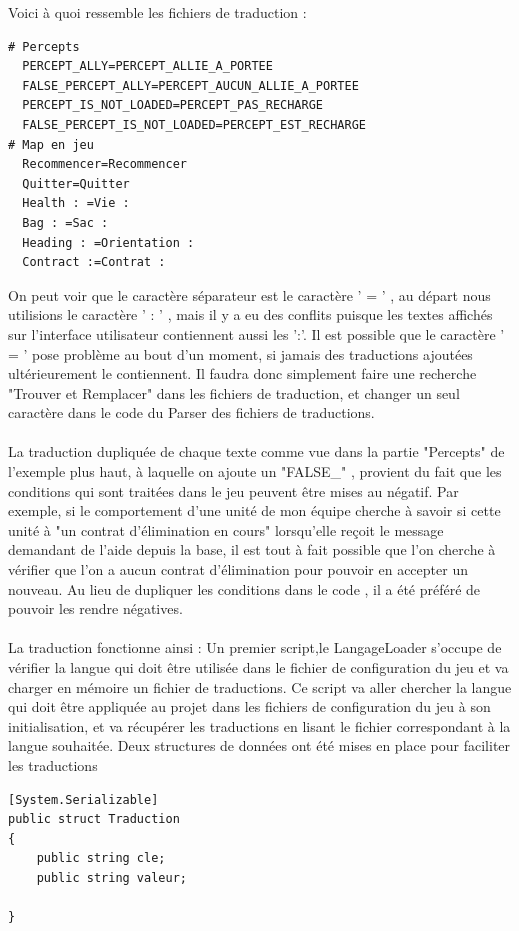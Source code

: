 \documentclass{report}
\begin{document}
Voici à quoi ressemble les fichiers de traduction :
\begin{lstlisting}[frame=single]
# Percepts
  PERCEPT_ALLY=PERCEPT_ALLIE_A_PORTEE
  FALSE_PERCEPT_ALLY=PERCEPT_AUCUN_ALLIE_A_PORTEE
  PERCEPT_IS_NOT_LOADED=PERCEPT_PAS_RECHARGE
  FALSE_PERCEPT_IS_NOT_LOADED=PERCEPT_EST_RECHARGE
# Map en jeu
  Recommencer=Recommencer
  Quitter=Quitter
  Health : =Vie :
  Bag : =Sac :
  Heading : =Orientation :
  Contract :=Contrat :
\end{lstlisting}

On peut voir que le caractère séparateur est le caractère ' = ' , au départ nous utilisions le caractère ' : ' , mais il y a eu des conflits puisque les textes affichés sur l'interface utilisateur contiennent aussi les ':'.
Il est possible que le caractère ' = ' pose problème au bout d'un moment, si jamais des traductions ajoutées ultérieurement le contiennent. Il faudra donc simplement faire une recherche "Trouver et Remplacer" dans les fichiers de traduction, et changer un seul caractère dans le code du Parser des fichiers de traductions.

\paragraph{}

La traduction dupliquée de chaque texte comme vue dans la partie "Percepts" de l'exemple plus haut, à laquelle on ajoute un "FALSE\_" , provient du fait que les conditions qui sont traitées dans le jeu peuvent être mises au négatif. Par exemple, si le comportement d'une unité de mon équipe cherche à savoir si cette unité à "un contrat d'élimination en cours" lorsqu'elle reçoit le message demandant de l'aide depuis la base, il est tout à fait possible que l'on cherche à vérifier que l'on a aucun contrat d'élimination pour pouvoir en accepter un nouveau.
Au lieu de dupliquer les conditions dans le code , il a été préféré de pouvoir les rendre négatives.
\paragraph{}
La traduction fonctionne ainsi :
Un premier script,le LangageLoader s'occupe de vérifier la langue qui doit être utilisée dans le fichier de configuration du jeu et va charger en mémoire un fichier  de traductions.
Ce script va aller chercher la langue qui doit être appliquée au projet dans les fichiers de configuration du jeu à son initialisation, et va récupérer les traductions en lisant le fichier correspondant à la langue souhaitée. 
Deux structures de données ont été mises en place pour faciliter les traductions 
\begin{lstlisting}[frame=single]
[System.Serializable]
public struct Traduction
{
    public string cle;
    public string valeur;

}
\end{lstlisting}
\end{document}
